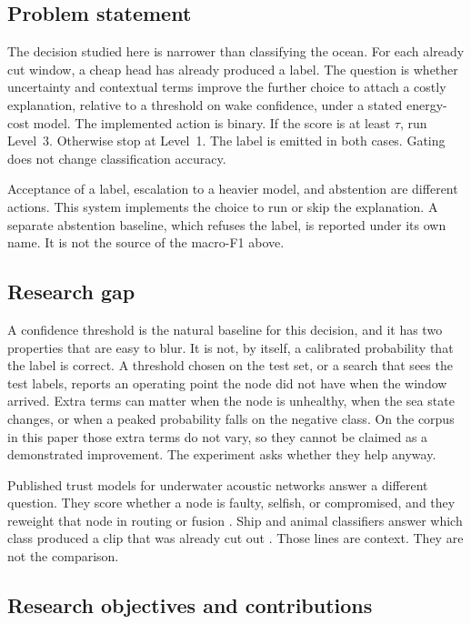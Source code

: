 \documentclass[sn-mathphys-num]{sn-jnl}%
\theoremstyle{thmstyleone}%
\theoremstyle{thmstyletwo}%
\theoremstyle{thmstylethree}%
\begin{document}
\subsection{Problem statement}\label{sec:problem}

The decision studied here is narrower than classifying the ocean. For each already cut window, a cheap head has already produced a label. The question is whether uncertainty and contextual terms improve the further choice to attach a costly explanation, relative to a threshold on wake confidence, under a stated energy-cost model. The implemented action is binary. If the score is at least $\tau$, run Level~3. Otherwise stop at Level~1. The label is emitted in both cases. Gating does not change classification accuracy.

Acceptance of a label, escalation to a heavier model, and abstention are different actions. This system implements the choice to run or skip the explanation. A separate abstention baseline, which refuses the label, is reported under its own name. It is not the source of the macro-F1 above.

\subsection{Research gap}\label{sec:gap}

A confidence threshold is the natural baseline for this decision, and it has two properties that are easy to blur. It is not, by itself, a calibrated probability that the label is correct. A threshold chosen on the test set, or a search that sees the test labels, reports an operating point the node did not have when the window arrived. Extra terms can matter when the node is unhealthy, when the sea state changes, or when a peaked probability falls on the negative class. On the corpus in this paper those extra terms do not vary, so they cannot be claimed as a demonstrated improvement. The experiment asks whether they help anyway.

Published trust models for underwater acoustic networks answer a different question. They score whether a node is faulty, selfish, or compromised, and they reweight that node in routing or fusion \cite{signori2022,song2025,he2024,xia2026,akyildiz2005}. Ship and animal classifiers answer which class produced a clip that was already cut out \cite{irfan2021,bohnenstiehl2023,hagiwara2022}. Those lines are context. They are not the comparison.

\subsection{Research objectives and contributions}\label{sec:contributions}
\end{document}
